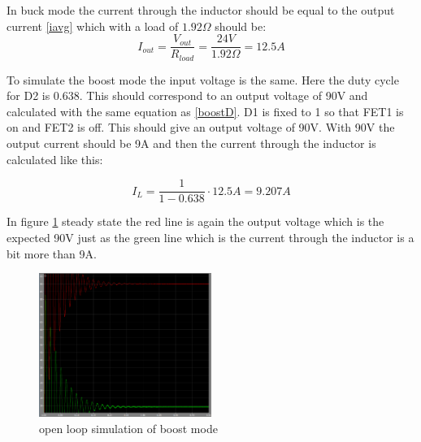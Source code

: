 In buck mode the current through the inductor should be equal to the output current \ref{iavg} which with a load of $1.92\Omega$ should be:
\begin{equation}
I_{out} = \frac{V_{out}}{R_{load}} = \frac{24V}{1.92\Omega} = 12.5A
\end{equation}   

To simulate the boost mode the input voltage is the same. Here the duty cycle for D2 is 0.638. This should correspond to an output voltage of 90V and calculated with the same equation as \ref{boostD}. D1 is fixed to 1 so that FET1 is on and FET2 is off. This should give an output voltage of 90V. With 90V the output current should be 9A and then the current through the inductor is calculated like this:

\begin{equation}
I_{L} = \frac{1}{1-0.638}\cdot 12.5A = 9.207A
\end{equation}  

In figure \ref{boostsim} steady state the red line is again the output voltage which is the expected 90V just as the green line which is the current through the inductor is a bit more than 9A.

\begin{figure}[H]
	\begin{center}
		\includegraphics[width=0.5\textwidth]{../Pictures/boostsim}
		\caption{open loop simulation of boost mode}
		\label{boostsim}
	\end{center}
\end{figure}

